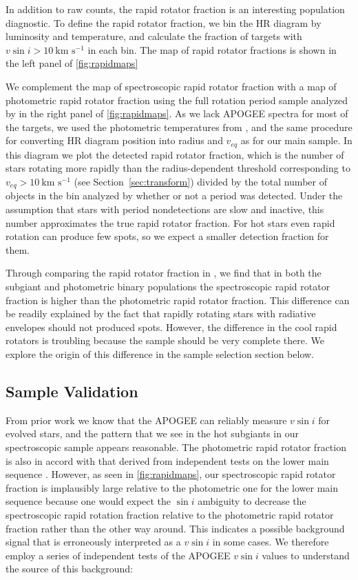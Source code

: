 \documentclass[preprint2]{aastex62}
\newcommand{\vsini}{\ensuremath{v \sin i}}
\newcommand{\kms}{\textrm{km~s}\ensuremath{^{-1}}}
\begin{document}
In addition to raw counts, the rapid rotator fraction is an interesting
population diagnostic. To define the rapid rotator fraction, we bin the HR
diagram by luminosity and temperature, and calculate the fraction of targets
with \(\vsini > 10~\kms\) in each bin. The map of rapid rotator fractions is
shown in the left panel of \cref{fig:rapidmaps}

We complement the map of spectroscopic rapid rotator fraction with a map of photometric rapid rotator fraction
using the full rotation period sample analyzed by \citet{McQuillan14} in the 
right panel of \cref{fig:rapidmaps}. As we lack APOGEE spectra for most of the
\citet{McQuillan14} targets,
we used the photometric temperatures from \citet{Berger18b}, and the same
procedure for converting HR diagram position into radius and \(v_{eq}\) as for
our main sample. In this diagram we plot the detected rapid
rotator fraction, which is the number of stars rotating more rapidly than the
radius-dependent threshold corresponding to \(v_{eq} > 10~\kms\) (see
Section~\ref{sec:transform}) divided by the total number of objects in the
bin analyzed by \citet{McQuillan14} whether or not a period was detected. Under
the assumption that stars with period nondetections are slow and inactive,
this number approximates the true rapid rotator fraction. For hot stars even 
rapid rotation can produce few spots, so we expect a smaller detection fraction
for them.

Through comparing the rapid rotator fraction in \citet{McQuillan14}, we find
that in both the subgiant and photometric binary populations the spectroscopic 
rapid rotator fraction is higher than the photometric rapid rotator fraction.
This difference can be readily explained by the fact that rapidly rotating stars 
with radiative envelopes should not produced spots. However,
the difference in the cool rapid rotators is troubling because the 
\citet{McQuillan14} sample should be very complete there. We explore the origin 
of this difference in the sample selection section below.

\subsection{Sample Validation}

From prior work \citep{Tayar15} we know that the APOGEE can reliably measure
\vsini{} for evolved stars, and the pattern that we see in the hot subgiants in
our spectroscopic sample appears reasonable. The photometric rapid rotator
fraction is also in accord with that derived from independent tests on the lower 
main sequence \citep{Simonian19}. However, as seen in \cref{fig:rapidmaps}, our 
spectroscopic rapid rotator fraction is implausibly large relative to the 
photometric one for the lower main sequence because one would expect the \(\sin
i\) ambiguity to decrease the spectroscopic rapid rotation fraction relative to
the photometric rapid rotator fraction rather than the other way around. This 
indicates a possible background signal that is erroneously
interpreted as a \vsini{} in some cases. We therefore employ a series of
independent tests of the APOGEE \vsini{} values to understand the source of
this background:
\end{document}
